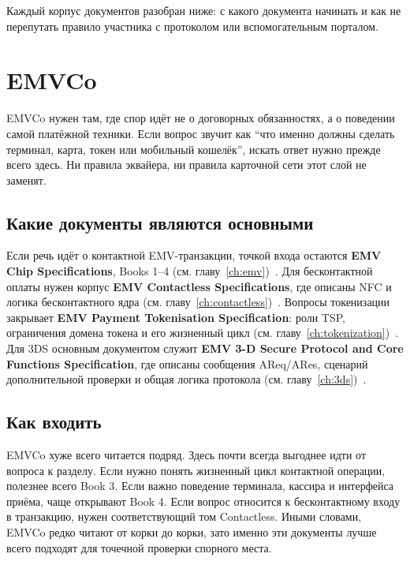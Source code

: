 Каждый корпус документов разобран ниже: с какого документа начинать
и как не перепутать правило участника с протоколом
или вспомогательным порталом.

\section{EMVCo}
\label{sec:ps-emvco}

EMVCo нужен там, где спор идёт не о договорных обязанностях,
а о поведении самой платёжной техники. Если вопрос звучит как
\enquote{что именно должны сделать терминал, карта, токен
или мобильный кошелёк}, искать ответ нужно прежде всего здесь.
Ни правила эквайера, ни правила карточной сети этот слой
не заменят.

\subsection*{Какие документы являются основными}

Если речь идёт о контактной EMV-транзакции, точкой входа остаются
\textbf{EMV Chip Specifications}, Books 1--4
(см. главу~\ref{ch:emv})~\cite{emvco-specs}. Для бесконтактной оплаты
нужен корпус
\textbf{EMV Contactless Specifications}, где описаны NFC
и логика бесконтактного ядра
(см. главу~\ref{ch:contactless})~\cite{emvco-contactless-chip}.
Вопросы токенизации закрывает
\textbf{EMV Payment Tokenisation Specification}: роли TSP,
ограничения домена токена и его жизненный цикл
(см. главу~\ref{ch:tokenization})~\cite{emvco-payment-tokenisation}.
Для 3DS основным документом
служит \textbf{EMV 3-D Secure Protocol and Core Functions
Specification}, где описаны сообщения AReq/ARes, сценарий
дополнительной проверки и общая логика протокола
(см. главу~\ref{ch:3ds})~\cite{emvco-3ds}.

\subsection*{Как входить}

EMVCo хуже всего читается подряд. Здесь почти всегда выгоднее идти
от вопроса к разделу. Если нужно понять жизненный цикл контактной
операции, полезнее всего Book 3. Если важно поведение терминала,
кассира и интерфейса приёма, чаще открывают Book 4. Если вопрос
относится к бесконтактному входу в транзакцию, нужен соответствующий
том Contactless. Иными словами, EMVCo редко читают от корки
до корки, зато именно эти документы лучше всего подходят
для точечной проверки спорного места.

